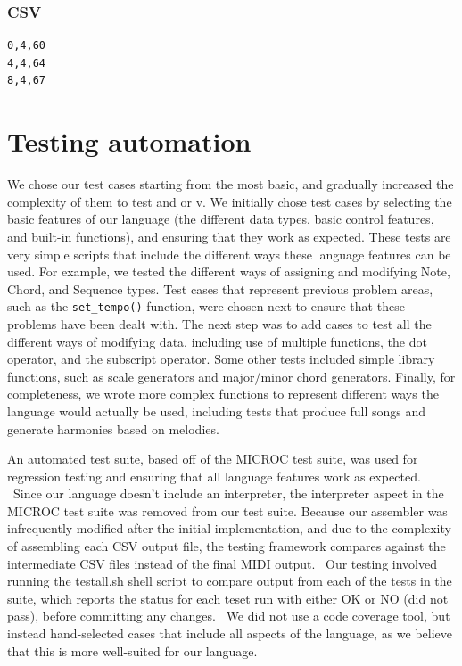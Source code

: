 \documentclass[12pt,A4]{book}
\begin{document}
\subsubsection{CSV}
\begin{verbatim}
0,4,60
4,4,64
8,4,67
\end{verbatim}

\section{Testing automation}
We chose our test cases starting from the most basic, and gradually increased the complexity of them to test and or v.  We initially chose test cases by selecting the basic features of our language (the different data types, basic control features, and built-in functions), and ensuring that they work as expected.  These tests are very simple scripts that include the different ways these language features can be used. For example, we tested the different ways of assigning and modifying Note, Chord, and Sequence types. Test cases that represent previous problem areas, such as the \verb|set_tempo()| function, were chosen next to ensure that these problems have been dealt with.  The next step was to add cases to test all the different ways of modifying data, including use of multiple functions, the dot operator, and the subscript operator.  Some other tests included simple library functions, such as scale generators and major/minor chord generators.  Finally, for completeness, we wrote more complex functions to represent different ways the language would actually be used, including tests that produce full songs and generate harmonies based on melodies.

An automated test suite, based off of the MICROC test suite, was used for regression testing and ensuring that all language features work as expected.  Since our language doesn’t include an interpreter, the interpreter aspect in the MICROC test suite was removed from our test suite. Because our assembler was infrequently modified after the initial implementation, and due to the complexity of assembling each CSV output file, the testing framework compares against the intermediate CSV files instead of the final MIDI output.  Our testing involved running the testall.sh shell script to compare output from each of the tests in the suite, which reports the status for each teset run with either OK or NO (did not pass), before committing any changes.  We did not use a code coverage tool, but instead hand-selected cases that include all aspects of the language, as we believe that this is more well-suited for our language.
\end{document}
